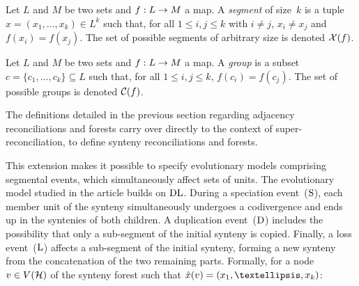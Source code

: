 \begin{definition}[Segments]\label{definition:seg}
    Let \(L\) and \(M\) be two sets and \(f : L \rightarrow M\) a map.
    A \emph{segment} of size~\(k\) is a tuple \(x = (x_1, …, x_k) \in L^k\) such that, for all \(1 \leq i, j \leq k\) with \(i \neq j\), \(x_i \neq x_j\) and \(f(x_i) = f(x_j)\).
    The set of possible segments of arbitrary size is denoted \(\mathcal{X}(f)\).
\end{definition}

\begin{definition}[Groups]\label{definition:cluster}
    Let \(L\) and \(M\) be two sets and \(f : L \rightarrow M\) a map.
    A \emph{group} is a subset \(c = \{c_1, …, c_k\} \subseteq L\) such that, for all \(1 \leq i, j \leq k\), \(f(c_i) = f(c_j)\).
    The set of possible groups is denoted \(\mathcal{C}(f)\).
\end{definition}

The definitions detailed in the previous section regarding adjacency reconciliations and forests carry over directly to the context of super-reconciliation, to define synteny reconciliations and forests.

This extension makes it possible to specify evolutionary models comprising segmental events, which simultaneously affect sets of units.
The evolutionary model studied in the article builds on \(\mathrm{D}\mathrm{L}\).
During a speciation event~(\(\mathrm{S}\)), each member unit of the synteny simultaneously undergoes a codivergence and ends up in the syntenies of both children.
A duplication event~(\(\mathrm{D}\)) includes the possibility that only a sub-segment of the initial synteny is copied.
Finally, a loss event~(\(\mathrm{L}\)) affects a sub-segment of the initial synteny, forming a new synteny from the concatenation of the two remaining parts.
Formally, for a node \(v \in V(\mathcal{H})\) of the synteny forest such that \(\exseg(v) = (x_1, …, x_k)\):

